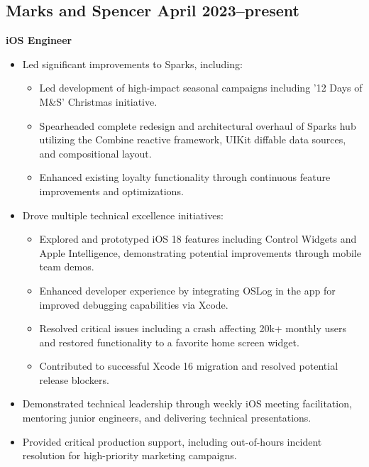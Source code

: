 \documentclass[11pt,a4paper]{article}
\begin{document}
\subsection*{Marks and Spencer \hfill April 2023--present}
\textbf{iOS Engineer}
\begin{itemize}[leftmargin=*]
\item Led significant improvements to Sparks, including:
\begin{itemize}
\item Led development of high-impact seasonal campaigns including '12 Days of M\&S' Christmas initiative.
\item Spearheaded complete redesign and architectural overhaul of Sparks hub utilizing the Combine reactive framework, UIKit diffable data sources, and compositional layout.
\item Enhanced existing loyalty functionality through continuous feature improvements and optimizations.
\end{itemize}
\item Drove multiple technical excellence initiatives:
\begin{itemize}
\item Explored and prototyped iOS 18 features including Control Widgets and Apple Intelligence, demonstrating potential improvements through mobile team demos.
\item Enhanced developer experience by integrating OSLog in the app for improved debugging capabilities via Xcode.
\item Resolved critical issues including a crash affecting 20k+ monthly users and restored functionality to a favorite home screen widget.
\item Contributed to successful Xcode 16 migration and resolved potential release blockers.
\end{itemize}
\item Demonstrated technical leadership through weekly iOS meeting facilitation, mentoring junior engineers, and delivering technical presentations.
\item Provided critical production support, including out-of-hours incident resolution for high-priority marketing campaigns.
\end{itemize}
\end{document}
